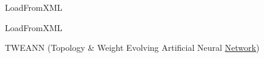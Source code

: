 
\begin{DoxyRefList}
\item[\label{todo__todo000001}%
\hypertarget{todo__todo000001}{}%
Class \hyperlink{class_dataset}{Dataset$<$ T $>$} ]
\item[\label{todo__todo000002}%
\hypertarget{todo__todo000002}{}%
Class \hyperlink{class_network}{Network$<$ T $>$} ]Load\-From\-X\-M\-L 
\item[\label{todo__todo000003}%
\hypertarget{todo__todo000003}{}%
Class \hyperlink{class_parser}{Parser} ]Load\-From\-X\-M\-L 
\item[\label{todo__todo000004}%
\hypertarget{todo__todo000004}{}%
Class \hyperlink{class_trainer}{Trainer$<$ T $>$} ]T\-W\-E\-A\-N\-N (Topology \& Weight Evolving Artificial Neural \hyperlink{class_network}{Network})
\end{DoxyRefList}